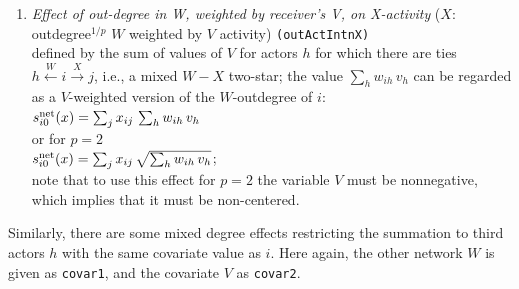 \documentclass[a4paper,fleqn,11pt]{article}
\newcommand{\+}{\, + \,}
\newcommand{\vit}{\theenumi}
\newcounter{savenumi}
\begin{document}
\begin{enumerate}
 \item {\em Effect of out-degree in W, weighted by receiver's V, on X-activity }
 ($X$: outdegree$^{1/p}$ $W$ weighted by $V$ activity)   \texttt{(outActIntnX)}\\
 defined by the sum of values of $V$ for actors $h$
 for which there are ties  $h \stackrel{W}{\leftarrow} i \stackrel{X}{\rightarrow} j$,
 i.e., a mixed $W - X$ two-star;
 the value $\sum_h w_{ih}\,v_h$ can be regarded as a $V$-weighted
 version of the $W$-outdegree of $i$:\\
 $s^{\rm net}_{i\vit}(x) =  \sum_j x_{ij}\, \sum_h w_{ih}\,v_h  $ \\
 or for $p=2$ \\
   $s^{\rm net}_{i\vit}(x) =  \sum_j x_{ij}\, \sqrt{\sum_h w_{ih}\,v_h}   $;\\
 note that to use this effect for $p=2$ the variable $V$ must be nonnegative,
 which implies that it must be non-centered.
\setcounter{savenumi}{\value{enumi}}
\end{enumerate}

Similarly, there are some mixed degree effects restricting the summation
to third actors $h$ with the same covariate value as $i$.
Here again, the other network $W$ is given as \texttt{covar1},
and the covariate $V$ as \texttt{covar2}.
\end{document}
